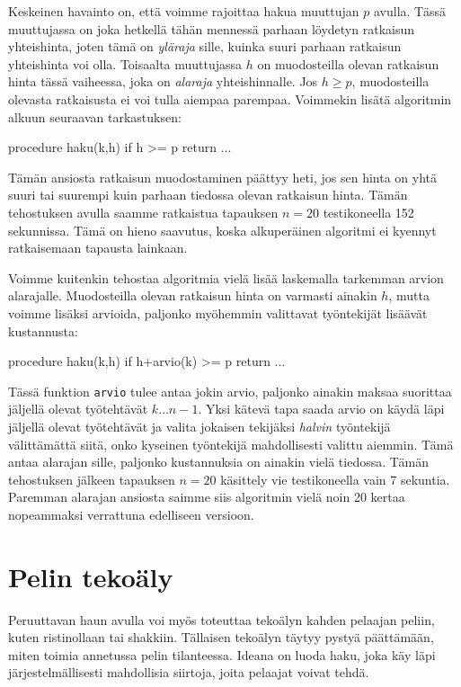 Keskeinen havainto on, että voimme rajoittaa hakua muuttujan
$p$ avulla. Tässä muuttujassa on joka hetkellä
tähän mennessä parhaan löydetyn ratkaisun yhteishinta,
joten tämä on \emph{yläraja} sille, kuinka suuri parhaan ratkaisun
yhteishinta voi olla.
Toisaalta muuttujassa $h$ on muodosteilla olevan ratkaisun
hinta tässä vaiheessa, joka on \emph{alaraja} yhteishinnalle.
Jos $h \ge p$, muodosteilla olevasta ratkaisusta ei
voi tulla aiempaa parempaa. Voimmekin lisätä algoritmin alkuun
seuraavan tarkastuksen:

\begin{code}
procedure haku(k,h)
    if h >= p
        return
    ...
\end{code}

Tämän ansiosta ratkaisun muodostaminen päättyy heti,
jos sen hinta on yhtä suuri tai suurempi kuin parhaan
tiedossa olevan ratkaisun hinta.
Tämän tehostuksen avulla saamme ratkaistua tapauksen $n=20$
testikoneella 152 sekunnissa.
Tämä on hieno saavutus, koska alkuperäinen algoritmi
ei kyennyt ratkaisemaan tapausta lainkaan.

Voimme kuitenkin tehostaa algoritmia vielä lisää
laskemalla tarkemman arvion alarajalle.
Muodosteilla olevan ratkaisun hinta on varmasti ainakin $h$,
mutta voimme lisäksi arvioida, paljonko myöhemmin valittavat
työntekijät lisäävät kustannusta:

\begin{code}
procedure haku(k,h)
    if h+arvio(k) >= p
        return
    ...
\end{code}

Tässä funktion \texttt{arvio} tulee antaa jokin arvio,
paljonko ainakin maksaa suorittaa jäljellä olevat työtehtävät $k \dots n-1$.
Yksi kätevä tapa saada arvio on käydä läpi jäljellä olevat
työtehtävät ja valita jokaisen tekijäksi \emph{halvin} työntekijä välittämättä
siitä, onko kyseinen työntekijä mahdollisesti valittu aiemmin.
Tämä antaa alarajan sille, paljonko kustannuksia on ainakin vielä tiedossa.
Tämän tehostuksen jälkeen tapauksen $n=20$ käsittely vie
testikoneella vain 7 sekuntia.
Paremman alarajan ansiosta saimme siis algoritmin
vielä noin 20 kertaa nopeammaksi verrattuna edelliseen versioon.

\section{Pelin tekoäly}

Peruuttavan haun avulla voi myös toteuttaa tekoälyn kahden pelaajan peliin,
kuten ristinollaan tai shakkiin.
Tällaisen tekoälyn täytyy pystyä päättämään,
miten toimia annetussa pelin tilanteessa.
Ideana on luoda haku, joka käy läpi
järjestelmällisesti mahdollisia siirtoja,
joita pelaajat voivat tehdä.

